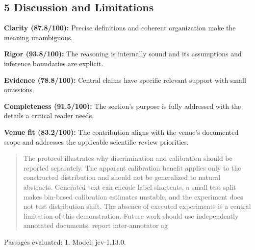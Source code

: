 \documentclass[11pt]{article}
\begin{document}
\subsection{5 Discussion and Limitations}
\par\textbf{Clarity (87.8/100):} Precise definitions and coherent organization make the meaning unambiguous.
\par\textbf{Rigor (93.8/100):} The reasoning is internally sound and its assumptions and inference boundaries are explicit.
\par\textbf{Evidence (78.8/100):} Central claims have specific relevant support with small omissions.
\par\textbf{Completeness (91.5/100):} The section's purpose is fully addressed with the details a critical reader needs.
\par\textbf{Venue fit (83.2/100):} The contribution aligns with the venue's documented scope and addresses the applicable scientific review priorities.
\begin{quote}\small The protocol illustrates why discrimination and calibration should be reported separately. The apparent
calibration benefit applies only to the constructed distribution and should not be generalized to natural
abstracts. Generated text can encode label shortcuts, a small test split makes bin-based calibration
estimates unstable, and the experiment does not test distribution shift. The absence of executed
experiments is a central limitation of this demonstration. Future work should use independently
annotated documents, report inter-annotator ag\end{quote}
Passages evaluated: 1. Model: jev-1.13.0.
\end{document}
